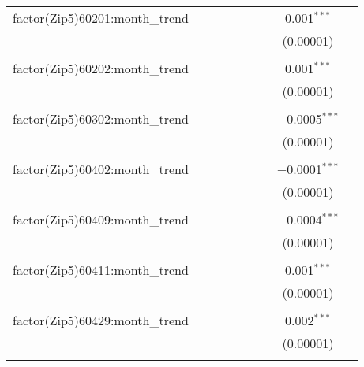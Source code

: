 \begin{table}[H]
{\begin{tabular}{@{\extracolsep{5pt}}lcccccccc}
  factor(Zip5)60201:month\_trend &  &  &  &  &  &  & 0.001$^{***}$ &  \\  

   &  &  &  &  &  &  & (0.00001) &  \\  

   & & & & & & & & \\  

  factor(Zip5)60202:month\_trend &  &  &  &  &  &  & 0.001$^{***}$ &  \\  

   &  &  &  &  &  &  & (0.00001) &  \\  

   & & & & & & & & \\  

  factor(Zip5)60302:month\_trend &  &  &  &  &  &  & $-$0.0005$^{***}$ &  \\  

   &  &  &  &  &  &  & (0.00001) &  \\  

   & & & & & & & & \\  

  factor(Zip5)60402:month\_trend &  &  &  &  &  &  & $-$0.0001$^{***}$ &  \\  

   &  &  &  &  &  &  & (0.00001) &  \\  

   & & & & & & & & \\  

  factor(Zip5)60409:month\_trend &  &  &  &  &  &  & $-$0.0004$^{***}$ &  \\  

   &  &  &  &  &  &  & (0.00001) &  \\  

   & & & & & & & & \\  

  factor(Zip5)60411:month\_trend &  &  &  &  &  &  & 0.001$^{***}$ &  \\  

   &  &  &  &  &  &  & (0.00001) &  \\  

   & & & & & & & & \\  

  factor(Zip5)60429:month\_trend &  &  &  &  &  &  & 0.002$^{***}$ &  \\  

   &  &  &  &  &  &  & (0.00001) &  \\  

   & & & & & & & & \\  


\end{tabular}}
\end{table}
